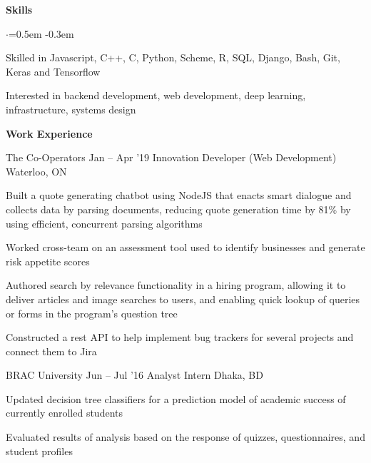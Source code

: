 \documentclass{resume} %
\begin{document}

\begin{rSection}{\textbf{Skills}}
  \vspace {0.3em}
  \begin{list}{$\cdot$}{\leftmargin=0.5em}
    \itemsep -0.3em \vspace{-0.3em}
    \item Skilled in Javascript, C++, C, Python, Scheme, R, SQL, Django, Bash, Git, Keras and Tensorflow
    \item Interested in backend development, web development, deep learning, infrastructure, systems design
  \end{list}
  \vspace{0.3em}
\end{rSection}


\begin{rSection}{\textbf{Work Experience}}
  \begin{rSubsection}{The Co-Operators}
    {Jan -- Apr '19}
         {Innovation Developer (Web Development)}
         {Waterloo, ON}
       \item Built a quote generating chatbot using NodeJS that enacts smart dialogue and collects data by parsing documents, reducing quote generation time by 81\% by using efficient, concurrent parsing algorithms
       \item Worked cross{-}team on an assessment tool used to identify businesses and generate risk appetite scores
       \item Authored search by relevance functionality in a hiring program, allowing it to deliver articles and image searches to users, and enabling quick lookup of queries or forms in the program's question tree
     \item Constructed a rest API to help implement bug trackers for several projects and connect them to Jira
  \end{rSubsection}

	\begin{rSubsection}{BRAC University}
		{Jun -- Jul '16}
		{Analyst Intern}
		{Dhaka, BD}
		\item Updated decision tree classifiers for a prediction model of academic success of currently enrolled students
		\item Evaluated results of analysis based on the response of quizzes, questionnaires, and student profiles

	\end{rSubsection}
  
\end{rSection} 
\end{document}
